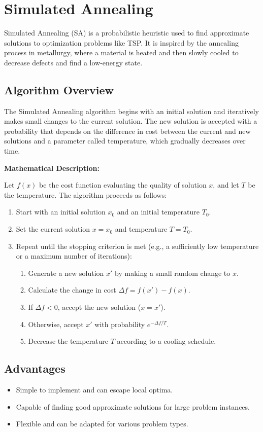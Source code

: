 \documentclass[a4paper,12pt]{report}
\begin{document}
\section{Simulated Annealing}
Simulated Annealing (SA) is a probabilistic heuristic used to find approximate solutions to optimization problems like TSP. It is inspired by the annealing process in metallurgy, where a material is heated and then slowly cooled to decrease defects and find a low-energy state.

\subsection{Algorithm Overview}
The Simulated Annealing algorithm begins with an initial solution and iteratively makes small changes to the current solution. The new solution is accepted with a probability that depends on the difference in cost between the current and new solutions and a parameter called temperature, which gradually decreases over time.

\textbf{Mathematical Description:}

Let $f(x)$ be the cost function evaluating the quality of solution $x$, and let $T$ be the temperature. The algorithm proceeds as follows:
\begin{enumerate}
    \item Start with an initial solution $x_0$ and an initial temperature $T_0$.
    \item Set the current solution $x = x_0$ and temperature $T = T_0$.
    \item Repeat until the stopping criterion is met (e.g., a sufficiently low temperature or a maximum number of iterations):
    \begin{enumerate}
        \item Generate a new solution $x'$ by making a small random change to $x$.
        \item Calculate the change in cost $\Delta f = f(x') - f(x)$.
        \item If $\Delta f < 0$, accept the new solution ($x = x'$).
        \item Otherwise, accept $x'$ with probability $e^{-\Delta f / T}$.
        \item Decrease the temperature $T$ according to a cooling schedule.
    \end{enumerate}
\end{enumerate}

\subsection{Advantages}
\begin{itemize}
    \item Simple to implement and can escape local optima.
    \item Capable of finding good approximate solutions for large problem instances.
    \item Flexible and can be adapted for various problem types.
\end{itemize}
\end{document}
